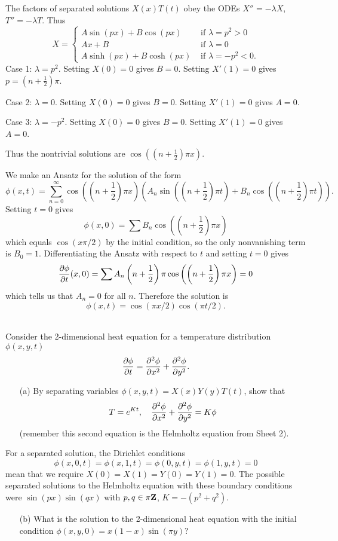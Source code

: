\documentclass[12pt]{article}
\begin{document}
\begin{answer}
The factors of separated solutions $X(x)T(t)$ obey the ODEs $X''=-\lambda X$, $T''=-\lambda T$. Thus
\[X=\begin{cases}
A\sin(px)+B\cos(px)&\mbox{ if }\lambda=p^2>0\\
Ax+B&\mbox{ if }\lambda=0\\
A\sinh(px)+B\cosh(px)&\mbox{ if }\lambda=-p^2<0.
\end{cases}\]
Case 1: $\lambda=p^2$. Setting $X(0)=0$ gives $B=0$. Setting $X'(1)=0$ gives $p=\left(n+\frac{1}{2}\right)\pi$.

Case 2: $\lambda=0$. Setting $X(0)=0$ gives $B=0$. Setting $X'(1)=0$ gives $A=0$.

Case 3: $\lambda=-p^2$. Setting $X(0)=0$ gives $B=0$. Setting $X'(1)=0$ gives $A=0$.

Thus the nontrivial solutions are $\cos\left(\left(n+\frac{1}{2}\right)\pi x\right)$.

We make an Ansatz for the solution of the form
\[\phi(x,t)=\sum_{n=0}^{\infty}\cos\left(\left(n+\frac{1}{2}\right)\pi x\right)\left(A_n\sin\left(\left(n+\frac{1}{2}\right)\pi t\right)+B_n\cos\left(\left(n+\frac{1}{2}\right)\pi t\right)\right).\]
Setting $t=0$ gives
\[\phi(x,0)=\sum B_n\cos\left(\left(n+\frac{1}{2}\right)\pi x\right)\]
which equals $\cos(x\pi/2)$ by the initial condition, so the only nonvanishing term is $B_0=1$. Differentiating the Ansatz with respect to $t$ and setting $t=0$ gives
\[\dfrac{\partial \phi}{\partial t}(x,0)=\sum A_n\left(n+\frac{1}{2}\right)\pi\cos\left(\left(n+\frac{1}{2}\right)\pi x\right)=0\]
which tells us that $A_n=0$ for all $n$. Therefore the solution is
\[\phi(x,t)=\cos(\pi x/2)\cos(\pi t/2).\]
\end{answer}
\newpage
\bigskip

\begin{question}\ \\
Consider the 2-dimensional heat equation for a temperature distribution $\phi(x,y,t)$
\[\dfrac{\partial \phi}{\partial t}=\dfrac{\partial^2 \phi}{\partial x^2}+\dfrac{\partial^2 \phi}{\partial y^2}.\]
\begin{enumerate}
\item[(a)] By separating variables $\phi(x,y,t)=X(x)Y(y)T(t)$, show that
\[T=e^{Kt},\quad\dfrac{\partial^2 \phi}{\partial x^2}+\dfrac{\partial^2 \phi}{\partial y^2}=K\phi\]
(remember this second equation is the Helmholtz equation from Sheet 2).
\end{enumerate}
For a separated solution, the Dirichlet conditions
\[\phi(x,0,t)=\phi(x,1,t)=\phi(0,y,t)=\phi(1,y,t)=0\]
mean that we require $X(0)=X(1)=Y(0)=Y(1)=0$. The possible separated solutions to the Helmholtz equation with these boundary conditions were $\sin(px)\sin(qx)$ with $p,q\in\pi\mathbf{Z}$, $K=-(p^2+q^2)$.
\begin{enumerate}
\item[(b)] What is the solution to the 2-dimensional heat equation with the initial condition $\phi(x,y,0)=x(1-x)\sin(\pi y)$?
\end{enumerate}
\end{question}
\end{document}
